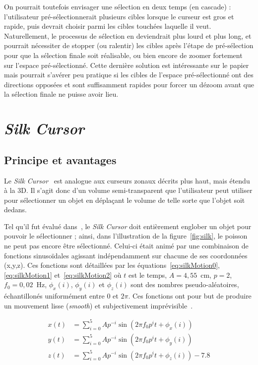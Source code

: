 	On pourrait toutefois envisager une sélection en deux temps (en cascade) : l'utilisateur pré-sélectionnerait plusieurs cibles lorsque le curseur est gros et rapide, puis devrait choisir parmi les cibles touchées laquelle il veut. Naturellement, le processus de sélection en deviendrait plus lourd et plus long, et pourrait nécessiter de stopper (ou ralentir) les cibles après l'étape de pré-sélection pour que la sélection finale soit réalisable, ou bien encore de zoomer fortement sur l'espace pré-sélectionné. Cette dernière solution est intéressante sur le papier mais pourrait s'avérer peu pratique si les cibles de l'espace pré-sélectionné ont des directions opposées et sont suffisamment rapides pour forcer un \og dézoom \fg{} avant que la sélection finale ne puisse avoir lieu.
	
\section{\emph{Silk Cursor}}
	\subsection{Principe et avantages}
	Le \emph{Silk Cursor}~\cite{zhai1994silk} est analogue aux curseurs zonaux décrits plus haut, mais étendu à la 3D. Il s'agit donc d'un volume semi-transparent que l'utilisateur peut utiliser pour sélectionner un objet en déplaçant le volume de telle sorte que l'objet soit dedans.
	
	Tel qu'il fut évalué dans~\cite{zhai1994silk}, le \emph{Silk Cursor} doit entièrement englober un objet pour pouvoir le sélectionner ; ainsi, dans l'illustration de la figure~\ref{fig:silk}, le poisson ne peut pas encore être sélectionné. Celui-ci était animé par une combinaison de fonctions sinusoïdales agissant indépendamment sur chacune de ses coordonnées (x,y,z). Ces fonctions sont détaillées par les équations~\ref{eq:silkMotion0}, \ref{eq:silkMotion1} et~\ref{eq:silkMotion2} où $t$ est le temps, $A = 4,55$~cm, $p = 2$, $f_{0} = 0,02$~Hz, 	$\phi_{x}(i)$, $\phi_{y}(i)$ et $\phi_{z}(i)$ sont des nombres pseudo-aléatoires, échantillonés uniformément entre $0$ et $2\pi$. Ces fonctions ont pour but de produire un mouvement lisse (\emph{smooth}) et subjectivement imprévisible~\cite{zhai1993human}.
	
	\begin{align}
		\label{eq:silkMotion0}
		x(t) &= \sum_{i=0}^{5} Ap^{-i} \sin \left( 2\pi{}f_{0}p^{i}t + \phi_{x}(i) \right) \\
		\label{eq:silkMotion1}
		y(t) &= \sum_{i=0}^{5} Ap^{-i} \sin \left( 2\pi{}f_{0}p^{i}t + \phi_{y}(i) \right) \\
		\label{eq:silkMotion2}
		z(t) &= \sum_{i=0}^{5} Ap^{-i} \sin \left( 2\pi{}f_{0}p^{i}t + \phi_{z}(i) \right) - 7.8
	\end{align}
	
